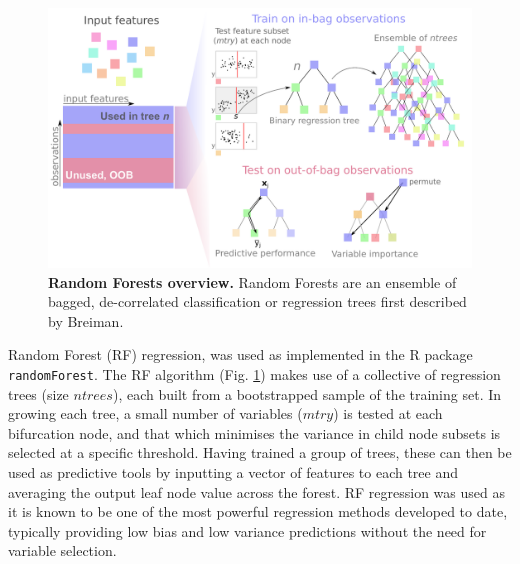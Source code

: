 \documentclass[a4paper,10pt,oneside]{book}
\begin{document}
\begin{figure}
\begin{center}
\includegraphics[width=\textwidth]{figs/randforests.pdf}
\captionsetup{width=\textwidth}
\caption{ {\bf Random Forests overview. } 
 Random Forests are an ensemble of bagged, de-correlated classification or regression trees first described by Breiman.\cite{Breiman2001a}
}\label{fig:randforests}
\end{center}
\end{figure} 

Random Forest (RF) regression,\cite{Breiman2001a}  was used
as implemented in the R package \texttt{randomForest}.\cite{Liaw2002}
The RF algorithm (Fig. \ref{fig:randforests}) makes use of a collective of regression trees (size $ntrees$), each built from a
bootstrapped sample of the training set. In growing each tree, a small
number of variables ($mtry$) is tested at each bifurcation node, and that which minimises the
variance in child node subsets is selected at a specific
threshold. Having trained a group of trees, these can then be used as
predictive tools by inputting a vector of features to each tree and
averaging the output leaf node value across the forest. RF regression
was used as it is known to be one of the most powerful regression
methods developed to date,\cite{Svetnik2003, Cutler2007} typically
providing low bias and low variance predictions without the need for
variable selection.\cite{Diaz2006, Dasgupta2012}

%
%
%
\end{document}
